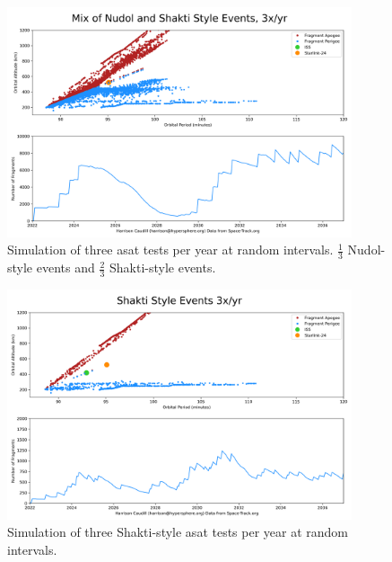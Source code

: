 \begin{figure}[h]
  \label{figure::gabby::doomsday::mix}
  \begin{center}
    \includegraphics[width=4in]{mix.png}
  \end{center}
  \caption{Simulation of three \ac{asat} tests per year at random
    intervals.  $\frac{1}{3}$ Nudol-style events and $\frac{2}{3}$
    Shakti-style events.}
\end{figure}

\begin{figure}[h]
  \label{figure::gabby::doomsday::shakti}
  \begin{center}
    \includegraphics[width=4in]{shakti.png}
  \end{center}
  \caption{Simulation of three Shakti-style \ac{asat} tests per year
    at random intervals.}
\end{figure}

